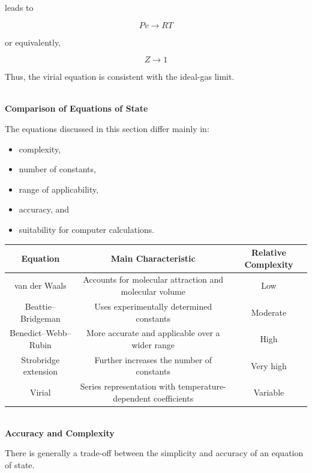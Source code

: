 \documentclass[12pt]{article}
\begin{document}
leads to

\begin{equation*}
\boxed{
Pv\rightarrow RT
}
\end{equation*}

or equivalently,

\begin{equation*}
\boxed{
Z\rightarrow1
}
\end{equation*}

Thus, the virial equation is consistent with the ideal-gas limit.

\textbf{\\ Comparison of Equations of State}

The equations discussed in this section differ mainly in:
\begin{itemize}
    \item complexity,
    \item number of constants,
    \item range of applicability,
    \item accuracy, and
    \item suitability for computer calculations.
\end{itemize}

\begin{center}
\hspace*{-2cm}
\begin{tabular}{|c|c|c|}
\hline
\textbf{Equation} & \textbf{Main Characteristic} & \textbf{Relative Complexity} \\
\hline
van der Waals & Accounts for molecular attraction and molecular volume & Low \\
\hline
Beattie--Bridgeman & Uses experimentally determined constants & Moderate \\
\hline
Benedict--Webb--Rubin & More accurate and applicable over a wider range & High \\
\hline
Strobridge extension & Further increases the number of constants & Very high \\
\hline
Virial & Series representation with temperature-dependent coefficients & Variable \\
\hline
\end{tabular}
\end{center}

\textbf{\\ Accuracy and Complexity}

There is generally a trade-off between the simplicity and accuracy of an equation of state.
\end{document}
